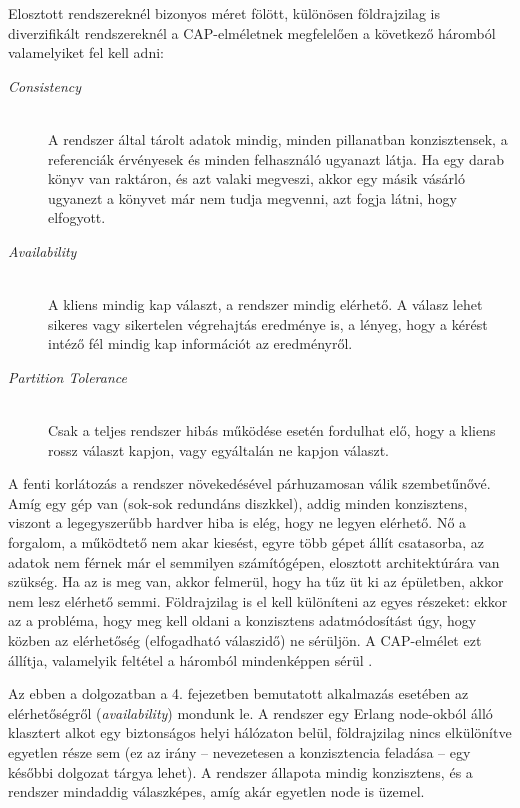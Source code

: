 \documentclass[12pt, a4paper, oneside]{book}
\begin{document}
Elosztott rendszereknél bizonyos méret fölött, különösen földrajzilag is
diverzifikált rendszereknél a CAP-elméletnek megfelelően a következő háromból
valamelyiket fel kell adni:
\begin{description}
\item[\emph{Consistency}] \hfill \\
 A rendszer által tárolt adatok mindig, minden pillanatban konzisztensek, a
referenciák érvényesek és minden felhasználó ugyanazt látja. Ha egy darab könyv
van raktáron, és azt valaki megveszi, akkor egy másik vásárló ugyanezt a
könyvet már nem tudja megvenni, azt fogja látni, hogy elfogyott.

\item[\emph{Availability}] \hfill \\
  A kliens mindig kap választ, a rendszer mindig elérhető. A válasz lehet
sikeres vagy sikertelen végrehajtás eredménye is, a lényeg, hogy a kérést
intéző fél mindig kap információt az eredményről.

\item[\emph{Partition Tolerance}] \hfill \\
 Csak a teljes rendszer hibás működése esetén fordulhat elő, hogy a kliens
rossz választ kapjon, vagy egyáltalán ne kapjon választ.
\end{description}

\noindent A fenti korlátozás a rendszer növekedésével párhuzamosan válik
szembetűnővé. Amíg egy gép van (sok-sok redundáns diszkkel), addig minden
konzisztens, viszont a legegyszerűbb hardver hiba is elég, hogy ne legyen
elérhető. Nő a forgalom, a működtető nem akar kiesést, egyre több gépet állít
csatasorba, az adatok nem férnek már el semmilyen számítógépen, elosztott
architektúrára van szükség. Ha az is meg van, akkor felmerül, hogy ha tűz üt ki
az épületben, akkor nem lesz elérhető semmi. Földrajzilag is el kell különíteni
az egyes részeket: ekkor az a probléma, hogy meg kell oldani a konzisztens
adatmódosítást úgy, hogy közben az elérhetőség (elfogadható válaszidő) ne
sérüljön. A CAP-elmélet ezt állítja, valamelyik feltétel a háromból
mindenképpen sérül \citep{CAP}.

Az ebben a dolgozatban a 4. fejezetben bemutatott alkalmazás esetében az
elérhetőségről (\emph{availability}) mondunk le. A rendszer egy Erlang
node-okból álló klasztert alkot egy biztonságos helyi hálózaton belül,
földrajzilag nincs elkülönítve egyetlen része sem (ez az irány -- nevezetesen a
konzisztencia feladása -- egy későbbi dolgozat tárgya lehet). A rendszer
állapota mindig konzisztens, és a rendszer mindaddig válaszképes, amíg akár
egyetlen node is üzemel.
\end{document}
